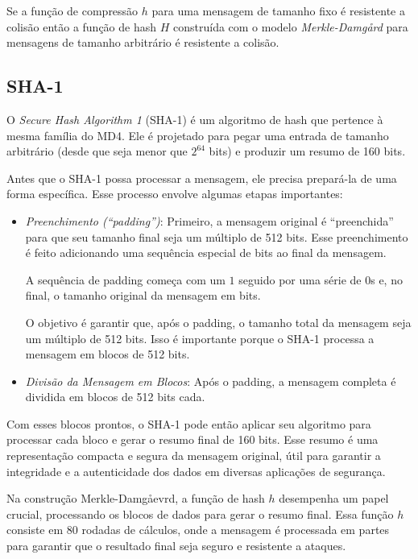 \begin{theorem}
  Se a função de compressão $h$ para uma mensagem de tamanho fixo é resistente a colisão então a função de hash $H$ construída com o modelo {\em Merkle-Damg\aa rd} para mensagens de tamanho arbitrário é resistente a colisão.
\end{theorem}

\subsection{SHA-1}
\label{sec:sha-1}

O {\em Secure Hash Algorithm 1} (SHA-1) é um algoritmo de hash que pertence à mesma família do MD4.
Ele é projetado para pegar uma entrada de tamanho arbitrário (desde que seja menor que $2^{64}$ bits) e produzir um resumo de 160 bits.

Antes que o SHA-1 possa processar a mensagem, ele precisa prepará-la de uma forma específica. Esse processo envolve algumas etapas importantes:

\begin{itemize}
\item[] {\em Preenchimento (``padding'')}:
  Primeiro, a mensagem original é ``preenchida'' para que seu tamanho final seja um múltiplo de 512 bits.
  Esse preenchimento é feito adicionando uma sequência especial de bits ao final da mensagem.

  A sequência de padding começa com um $1$ seguido por uma série de $0$s e, no final, o tamanho original da mensagem em bits.

  O objetivo é garantir que, após o padding, o tamanho total da mensagem seja um múltiplo de 512 bits.
  Isso é importante porque o SHA-1 processa a mensagem em blocos de 512 bits.
\item[] {\em Divisão da Mensagem em Blocos}:
  Após o padding, a mensagem completa é dividida em blocos de 512 bits cada.
\end{itemize}

Com esses blocos prontos, o SHA-1 pode então aplicar seu algoritmo para processar cada bloco e gerar o resumo final de 160 bits.
Esse resumo é uma representação compacta e segura da mensagem original, útil para garantir a integridade e a autenticidade dos dados em diversas aplicações de segurança.

Na construção Merkle-Damg\aa evrd, a função de hash $h$ desempenha um papel crucial, processando os blocos de dados para gerar o resumo final.
Essa função $h$ consiste em 80 rodadas de cálculos, onde a mensagem é processada em partes para garantir que o resultado final seja seguro e resistente a ataques.

